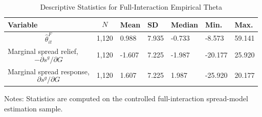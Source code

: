 \begin{table}[H]\centering
\begin{threeparttable}
\caption{Descriptive Statistics for Full-Interaction Empirical Theta}
\label{tab:theta_descriptive_stats}
\scriptsize
\begin{tabularx}{\textwidth}{lYYYYYY}
\toprule
Variable & $$N$$ & Mean & SD & Median & Min. & Max. \\
\midrule
$$\widehat{\theta}^{F}_{it}$$ & 1,120 & 0.988 & 7.935 & -0.733 & -8.573 & 59.141 \\
Marginal spread relief, $$-\partial s^g/\partial G$$ & 1,120 & -1.607 & 7.225 & -1.987 & -20.177 & 25.920 \\
Marginal spread response, $$\partial s^g/\partial G$$ & 1,120 & 1.607 & 7.225 & 1.987 & -25.920 & 20.177 \\
\bottomrule
\end{tabularx}
\begin{tablenotes}[flushleft]\footnotesize
\item Notes: Statistics are computed on the controlled full-interaction spread-model estimation sample.
\end{tablenotes}
\end{threeparttable}
\end{table}
